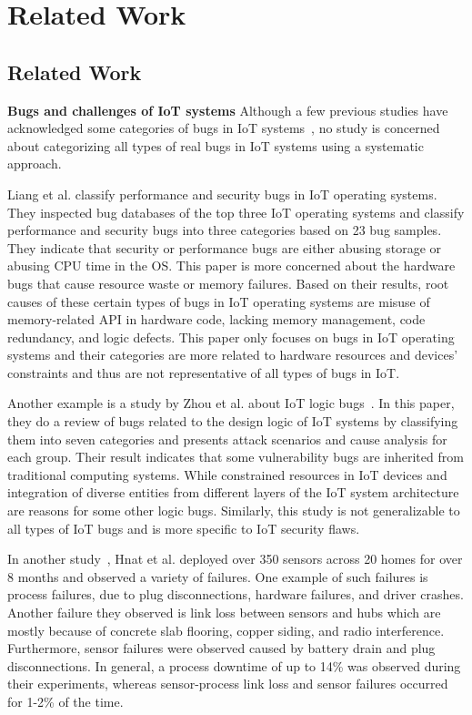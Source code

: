 
\chapter{Related Work}
\label{ch:literature}
\section{Related Work}
\textbf{Bugs and challenges of IoT systems}
Although a few previous studies have acknowledged some categories of bugs in IoT systems~\cite{IoTOSBugs,chen2017application,hnat2011hitchhiker}, no study is concerned about categorizing all types of real bugs in IoT systems using a systematic approach. 

Liang et al. \cite{IoTOSBugs} classify performance and security bugs in IoT operating systems. They inspected bug databases of the top three IoT operating systems and classify performance and security bugs into three categories based on 23 bug samples. They indicate that security or performance bugs are either abusing storage or abusing CPU time in the OS. This paper is more concerned about the hardware bugs that cause resource waste or memory failures. Based on their results, root causes of these certain types of bugs in IoT operating systems are misuse of memory-related API in hardware code, lacking memory management, code redundancy, and logic defects. This paper only focuses on bugs in IoT operating systems and their categories are more related to hardware resources and devices' constraints and thus are not representative of all types of bugs in IoT.  

Another example is a study by Zhou et al. about IoT logic bugs~\cite{zhou2019logic}. In this paper, they do a review of bugs related to the design logic of IoT systems by classifying them into seven categories and presents attack scenarios and cause analysis for each group. Their result indicates that some vulnerability bugs are inherited from traditional computing systems. While constrained resources in IoT devices and integration of diverse entities from different layers of the IoT system architecture are reasons for some other logic bugs. Similarly, this study is not generalizable to all types of IoT bugs and is more specific to IoT security flaws.

In another study~\cite{hnat2011hitchhiker}, Hnat et al. deployed over 350 sensors across 20 homes for over 8 months and observed a variety of failures. One example of such failures is process failures, due to plug disconnections, hardware failures, and driver crashes. Another failure they observed is link loss between sensors and hubs which are mostly because of concrete slab flooring, copper siding, and radio interference. Furthermore, sensor failures were observed caused by battery drain and plug disconnections. In general, a process downtime of up to 14\% was observed during their experiments, whereas sensor-process link loss and sensor failures occurred for 1-2\% of the time.

